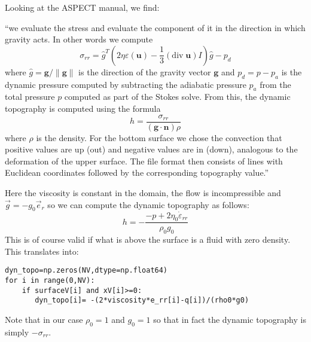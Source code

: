 

Looking at the ASPECT manual, we find:

``we evaluate the stress and evaluate the component of it in the direction in which 
gravity acts. In other words we compute 
\[
\sigma_{rr}={\hat g}^T (2 \eta \varepsilon(\mathbf u)
- \frac 13 (\textrm{div}\;\mathbf u)I)\hat g - p_d
\] 
where 
$\hat g = \mathbf g/\|\mathbf g\|$ is the direction of 
the gravity vector $\mathbf g$ and $p_d=p-p_a$ is the dynamic 
pressure computed by subtracting the adiabatic pressure $p_a$ 
from the total pressure $p$ computed as part of the Stokes 
solve. From this, the dynamic 
topography is computed using the formula 
\[
h=\frac{\sigma_{rr}}{(\mathbf g \cdot \mathbf n)  \rho}
\] 
where $\rho$ is the density. For the bottom surface we chose the convection 
that positive values are up (out) and negative values are in (down), analogous to 
the deformation of the upper surface. 
The file format then consists of lines with Euclidean coordinates 
followed by the corresponding topography value.''

Here the viscosity is constant in the domain, the flow 
is incompressible and $\vec{g}= -g_0 \vec{e}_r$ so we can compute the 
dynamic topography as follows:
\[
h = - \frac{-p + 2 \eta_0 \dot{\varepsilon}_{rr} }{\rho_0 g_0}
\]
This is of course valid if what is above the surface is a fluid with zero density.
This translates into:

\begin{lstlisting}
dyn_topo=np.zeros(NV,dtype=np.float64)
for i in range(0,NV):
    if surfaceV[i] and xV[i]>=0:
       dyn_topo[i]= -(2*viscosity*e_rr[i]-q[i])/(rho0*g0) 
\end{lstlisting}

Note that in our case $\rho_0=1$ and $g_0=1$ so that in fact the dynamic topography 
is simply $-\sigma_{rr}$.





